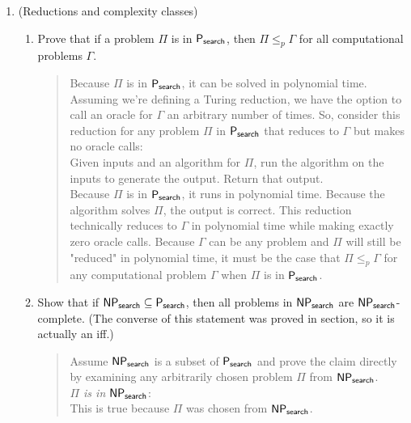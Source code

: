 \documentclass[11pt]{article}
\begin{document}
\begin{enumerate}
    \item (Reductions and complexity classes)  
    \begin{enumerate}
        \item Prove that if a problem $\Pi$ is in $\mathsf{P_{search}}$, then $\Pi\leq_p \Gamma$ for all computational problems $\Gamma$.

        \begin{quote}
            \color{purple}
            Because $\Pi$ is in $\mathsf{P_{search}}$, it can be solved in polynomial time. Assuming we're defining a Turing reduction, we have the option to call an oracle for $\Gamma$ an arbitrary number of times. So, consider this reduction for any problem $\Pi$ in $\mathsf{P_{search}}$ that reduces to $\Gamma$ but makes no oracle calls: \\

            Given inputs and an algorithm for $\Pi$, run the algorithm on the inputs to generate the output. Return that output. \\

            Because $\Pi$ is in $\mathsf{P_{search}}$, it runs in polynomial time. Because the algorithm solves $\Pi$, the output is correct. This reduction technically reduces to $\Gamma$ in polynomial time while making exactly zero oracle calls. Because $\Gamma$ can be any problem and $\Pi$ will still be "reduced" in polynomial time, it must be the case that $\Pi \leq_p \Gamma$ for any computational problem $\Gamma$ when $\Pi$ is in $\mathsf{P_{search}}$. \\
        \end{quote}

        
        \item Show that if $\mathsf{NP_{search}}\subseteq \mathsf{P_{search}}$, then all problems in $\mathsf{NP_{search}}$ are $\mathsf{NP_{search}}$-complete.  (The converse of this statement was proved in section, so it is actually an iff.)  
        \begin{quote}
            \color{purple}
            Assume $\mathsf{NP_{search}}$ is a subset of $\mathsf{P_{search}}$ and prove the claim directly by examining any arbitrarily chosen problem $\Pi$ from $\mathsf{NP_{search}}$. \\

            \textit{$\Pi$ is in $\mathsf{NP_{search}}$}: \\
            This is true because $\Pi$ was chosen from $\mathsf{NP_{search}}$. \\


\end{quote}
\end{enumerate}
\end{enumerate}
\end{document}
